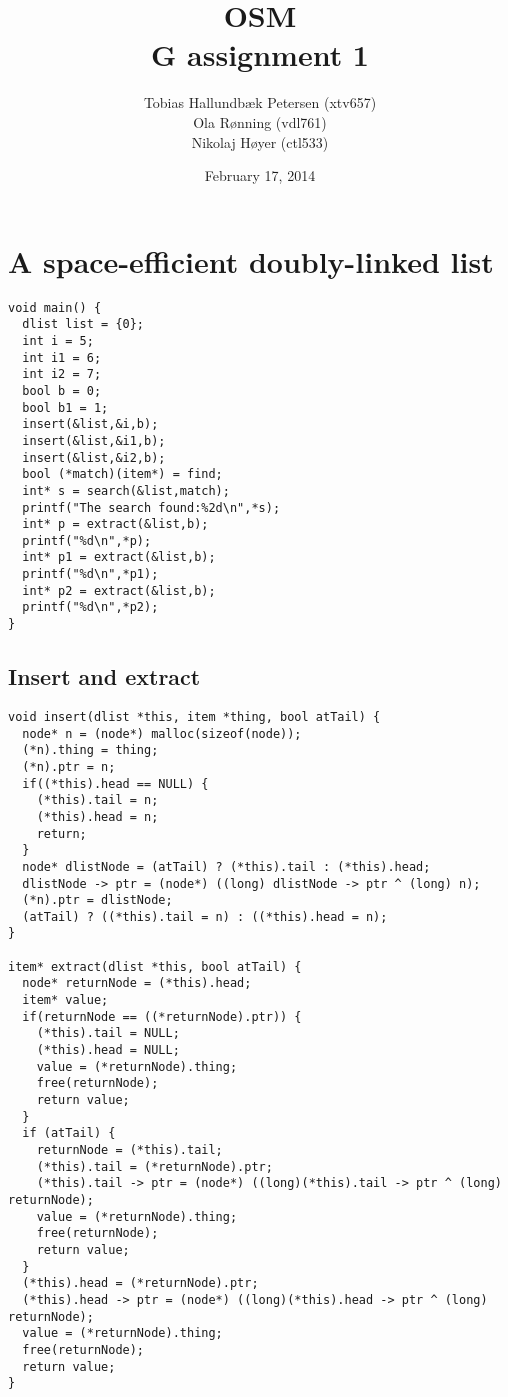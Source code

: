 \documentclass[a4paper,12pt]{article}
\title{OSM\\G assignment 1}
\author{Tobias Hallundbæk Petersen (xtv657)\\Ola Rønning (vdl761)\\Nikolaj Høyer (ctl533)}
\date{February 17, 2014}
\begin{document}
\maketitle
\tableofcontents
\newpage

\section{A space-efficient doubly-linked list}
\begin{lstlisting}
void main() {
  dlist list = {0};
  int i = 5;
  int i1 = 6;
  int i2 = 7;
  bool b = 0;
  bool b1 = 1;
  insert(&list,&i,b);
  insert(&list,&i1,b);
  insert(&list,&i2,b);
  bool (*match)(item*) = find;
  int* s = search(&list,match);
  printf("The search found:%2d\n",*s);
  int* p = extract(&list,b);
  printf("%d\n",*p);
  int* p1 = extract(&list,b);
  printf("%d\n",*p1);
  int* p2 = extract(&list,b);
  printf("%d\n",*p2);
}
\end{lstlisting}

\subsection{Insert and extract}
\begin{lstlisting}
void insert(dlist *this, item *thing, bool atTail) { 
  node* n = (node*) malloc(sizeof(node));
  (*n).thing = thing;
  (*n).ptr = n;
  if((*this).head == NULL) {     
    (*this).tail = n;
    (*this).head = n;
    return;
  }
  node* dlistNode = (atTail) ? (*this).tail : (*this).head;  
  dlistNode -> ptr = (node*) ((long) dlistNode -> ptr ^ (long) n); 
  (*n).ptr = dlistNode;
  (atTail) ? ((*this).tail = n) : ((*this).head = n);
}

item* extract(dlist *this, bool atTail) {
  node* returnNode = (*this).head;
  item* value;
  if(returnNode == ((*returnNode).ptr)) {
    (*this).tail = NULL;
    (*this).head = NULL;
    value = (*returnNode).thing;
    free(returnNode);
    return value;
  }
  if (atTail) {
    returnNode = (*this).tail;
    (*this).tail = (*returnNode).ptr;
    (*this).tail -> ptr = (node*) ((long)(*this).tail -> ptr ^ (long) returnNode);
    value = (*returnNode).thing;
    free(returnNode);
    return value;
  }  
  (*this).head = (*returnNode).ptr;
  (*this).head -> ptr = (node*) ((long)(*this).head -> ptr ^ (long) returnNode);
  value = (*returnNode).thing;
  free(returnNode);
  return value;
}
\end{lstlisting}
\end{document}
